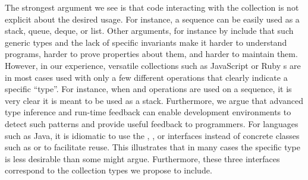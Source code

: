 \documentclass[sigconf, 10pt]{acmart}
\begin{document}
The strongest argument we see is
that code interacting with the collection is not explicit about
the desired usage.
For instance, a sequence can be easily used as a stack, queue, deque, or list.
Other arguments, for instance by \citet{PeytonJones:1996:BTC}
include that such generic types and the lack of specific invariants
make it harder to understand programs, harder to prove properties about them,
and harder to maintain them.
%
However, in our experience, versatile collections
such as JavaScript or Ruby s are in most cases
used with only a few different operations
that clearly indicate a specific ``type''.
For instance, when  and  operations are used on a sequence,
it is very clear it is meant to be used as a stack.
Furthermore, we argue that advanced type inference and run-time feedback
can enable development environments to detect such patterns
and provide useful feedback to programmers.
%
For languages such as Java, it is idiomatic to use the , , or  interfaces instead of concrete classes such as  or  to facilitate reuse.
This illustrates that in many cases the specific type
is less desirable than some might argue.
Furthermore, these three interfaces correspond to the collection types we propose to include.
\end{document}
